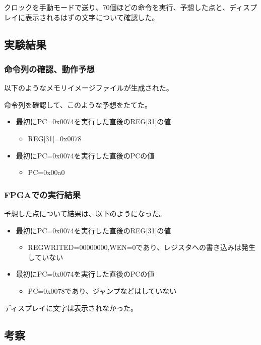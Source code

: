 クロックを手動モードで送り、70個ほどの命令を実行、予想した点と、ディスプレイに表示されるはずの文字について確認した。

\subsection{実験結果}
\subsubsection{命令列の確認、動作予想}
以下のようなメモリイメージファイルが生成された。


命令列を確認して、このような予想をたてた。
\begin{itemize}
  \item 最初にPC=0x0074を実行した直後のREG[31]の値
  \begin{itemize}
    \item REG[31]=0x0078
  \end{itemize}
  \item 最初にPC=0x0074を実行した直後のPCの値
  \begin{itemize}
    \item PC=0x00a0
  \end{itemize}
\end{itemize}

\subsubsection{FPGAでの実行結果}
予想した点について結果は、以下のようになった。
\begin{itemize}
  \item 最初にPC=0x0074を実行した直後のREG[31]の値
  \begin{itemize}
    \item REGWRITED=00000000,WEN=0であり、レジスタへの書き込みは発生していない
  \end{itemize}
  \item 最初にPC=0x0074を実行した直後のPCの値
  \begin{itemize}
    \item PC=0x0078であり、ジャンプなどはしていない
  \end{itemize}
\end{itemize}

ディスプレイに文字は表示されなかった。

\subsection{考察}
